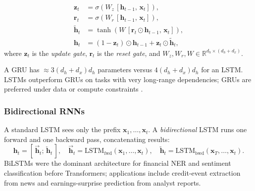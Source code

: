 \begin{deepdive}
\begin{definition}
\label{def:gru}
\begin{align}
  \mathbf{z}_t &= \sigma\!\left(W_z\,[\mathbf{h}_{t-1},\,\mathbf{x}_t]\right),
  \label{eq:gru-update}\\
  \mathbf{r}_t &= \sigma\!\left(W_r\,[\mathbf{h}_{t-1},\,\mathbf{x}_t]\right),
  \label{eq:gru-reset}\\
  \tilde{\mathbf{h}}_t &= \tanh\!\left(
    W\,[\mathbf{r}_t \odot \mathbf{h}_{t-1},\,\mathbf{x}_t]\right),
  \label{eq:gru-candidate}\\
  \mathbf{h}_t &= (1 - \mathbf{z}_t) \odot \mathbf{h}_{t-1}
    + \mathbf{z}_t \odot \tilde{\mathbf{h}}_t,
  \label{eq:gru-hidden}
\end{align}
where $\mathbf{z}_t$ is the \emph{update gate}, $\mathbf{r}_t$ is the
\emph{reset gate}, and $W_z, W_r, W \in \mathbb{R}^{d_h \times (d_h + d_x)}$.
\end{definition}

A GRU has $\approx 3(d_h+d_x)d_h$ parameters versus $4(d_h+d_x)d_h$ for an LSTM.
LSTMs outperform GRUs on tasks with very long-range dependencies; GRUs are preferred
under data or compute constraints \cite{chung2014empirical}. %

\subsubsection{Bidirectional RNNs}

A standard LSTM sees only the prefix $\mathbf{x}_1,\ldots,\mathbf{x}_t$.
A \emph{bidirectional} LSTM \cite{schuster1997bilstm} %
runs one forward and one backward pass, concatenating results:
\begin{equation}
  \mathbf{h}_t =
  [\,\overrightarrow{\mathbf{h}}_t;\,\overleftarrow{\mathbf{h}}_t\,],
  \quad
  \overrightarrow{\mathbf{h}}_t =
    \mathrm{LSTM}_{\mathrm{fwd}}(\mathbf{x}_1,\ldots,\mathbf{x}_t),
  \quad
  \overleftarrow{\mathbf{h}}_t =
    \mathrm{LSTM}_{\mathrm{bwd}}(\mathbf{x}_T,\ldots,\mathbf{x}_t).
  \label{eq:bilstm}
\end{equation}
BiLSTMs were the dominant architecture for financial NER and sentiment classification
before Transformers; applications include credit-event extraction from news
\cite{araci2019finbert} %
and earnings-surprise prediction from analyst reports.


\end{deepdive}
